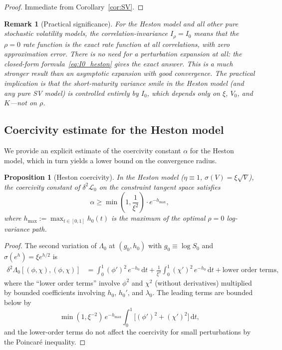 \documentclass[11pt]{article}
\newtheorem{proposition}[theorem]{Proposition}
\newtheorem{remark}[theorem]{Remark}
\theoremstyle{definition}
\newcommand{\dd}{\mathrm{d}}
\begin{document}
\begin{proof}
Immediate from Corollary~\ref{cor:SV}.
\end{proof}

\begin{remark}[Practical significance]\label{rem:doubled_practical}
For the Heston model and all other pure stochastic volatility models, the correlation-invariance $I_\rho = I_0$ means that the $\rho = 0$ rate function is the \emph{exact} rate function at all correlations, with zero approximation error. There is no need for a perturbation expansion at all: the closed-form formula~\eqref{eq:I0_heston} gives the exact answer. This is a much stronger result than an asymptotic expansion with good convergence. The practical implication is that the short-maturity variance smile in the Heston model (and any pure SV model) is controlled entirely by $I_0$, which depends only on $\xi$, $V_0$, and $K$---not on $\rho$.
\end{remark}

\subsection{Coercivity estimate for the Heston model}\label{sec:coercivity_heston}

We provide an explicit estimate of the coercivity constant $\alpha$ for the Heston model, which in turn yields a lower bound on the convergence radius.

\begin{proposition}[Heston coercivity]\label{prop:heston_coercivity}
In the Heston model ($\eta \equiv 1$, $\sigma(V) = \xi\sqrt{V}$), the coercivity constant of $\delta^2\mathcal{L}_0$ on the constraint tangent space satisfies
\begin{equation}\label{eq:heston_coercivity}
  \alpha \geq \min\!\left(1, \frac{1}{\xi^2}\right) \cdot e^{-h_{\max}},
\end{equation}
where $h_{\max} := \max_{t \in [0,1]} h_0(t)$ is the maximum of the optimal $\rho=0$ log-variance path.
\end{proposition}

\begin{proof}
The second variation of $\Lambda_0$ at $(g_0, h_0)$ with $g_0 \equiv \log S_0$ and $\sigma(e^h) = \xi e^{h/2}$ is
\begin{align}
  \delta^2\Lambda_0[(\phi,\chi), (\phi,\chi)] &= \int_0^1 (\phi')^2\,e^{-h_0}\,\dd t + \frac{1}{\xi^2}\int_0^1 (\chi')^2\,e^{-h_0}\,\dd t + \text{lower order terms},
\end{align}
where the ``lower order terms'' involve $\phi^2$ and $\chi^2$ (without derivatives) multiplied by bounded coefficients involving $h_0$, $h_0'$, and $\lambda_0$. The leading terms are bounded below by
\begin{equation}
  \min(1, \xi^{-2})\,e^{-h_{\max}} \int_0^1 \bigl[(\phi')^2 + (\chi')^2\bigr]\,\dd t,
\end{equation}
and the lower-order terms do not affect the coercivity for small perturbations by the Poincar\'e inequality.
\end{proof}
\end{document}
